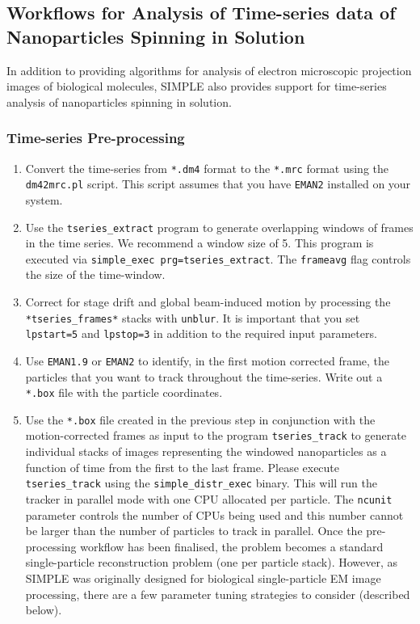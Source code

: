 \documentclass[a4paper,11pt]{article}
\newcommand{\prgname}[1]{\textcolor{NavyBlue}{\texttt{#1}}}
\begin{document}
\subsection{Workflows for Analysis of Time-series data of Nanoparticles Spinning in Solution}
In addition to providing algorithms for analysis of electron microscopic projection images of biological molecules, SIMPLE also provides support for time-series analysis of nanoparticles spinning in solution.
\subsubsection{Time-series Pre-processing}
\begin{enumerate}
\item Convert the time-series from \texttt{*.dm4} format to the \texttt{*.mrc} format using the \prgname{dm42mrc.pl} script. This script assumes that you have \texttt{EMAN2} installed on your system.
\item Use the \prgname{tseries\_extract} program to generate overlapping windows of frames in the time series. We recommend a window size of 5. This program is executed via \texttt{simple\_exec prg=tseries\_extract}. The \texttt{frameavg} flag controls the size of the time-window.
\item Correct for stage drift and global beam-induced motion by processing the \texttt{*tseries\_frames*} stacks with \prgname{unblur}. It is important that you set \texttt{lpstart=5} and \texttt{lpstop=3} in addition to the required input parameters.
\item Use \texttt{EMAN1.9} or \texttt{EMAN2} to identify, in the first motion corrected frame, the particles that you want to track throughout the time-series. Write out a \texttt{*.box} file with the particle coordinates.
\item Use the \texttt{*.box} file created in the previous step in conjunction with the motion-corrected frames as input to the program \prgname{tseries\_track} to generate individual stacks of images representing the windowed nanoparticles as a function of time from the first to the last frame. Please execute \prgname{tseries\_track} using the \texttt{simple\_distr\_exec} binary. This will run the tracker in parallel mode with one CPU allocated per particle. The \texttt{ncunit} parameter controls the number of CPUs being used and this number cannot be larger than the number of particles to track in parallel.
Once the pre-processing workflow has been finalised, the problem becomes a standard single-particle reconstruction problem (one per particle stack). However, as SIMPLE was originally designed for biological single-particle EM image processing, there are a few parameter tuning strategies to consider (described below).
\end{enumerate}
\end{document}
